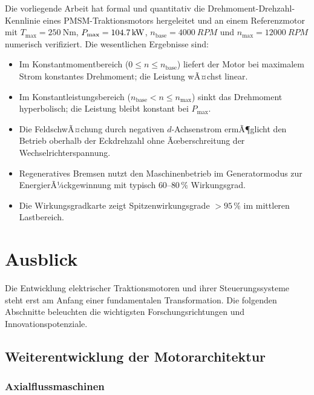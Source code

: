 ﻿\documentclass[a4paper,12pt]{article}
\theoremstyle{definition}
\begin{document}
Die vorliegende Arbeit hat formal und quantitativ die Drehmoment-Drehzahl-Kennlinie
eines PMSM-Traktionsmotors hergeleitet und an einem Referenzmotor mit
$T_{\max} = \SI{250}{\newton\metre}$, $P_{\max} = \SI{104{,}7}{\kilo\watt}$,
$n_{\mathrm{base}} = \SI{4000}{RPM}$ und $n_{\max} = \SI{12000}{RPM}$ numerisch
verifiziert. Die wesentlichen Ergebnisse sind:

\begin{itemize}
    \item Im Konstantmomentbereich ($0 \leq n \leq n_{\mathrm{base}}$) liefert der
          Motor bei maximalem Strom konstantes Drehmoment; die Leistung wÃ¤chst linear.
    \item Im Konstantleistungsbereich ($n_{\mathrm{base}} < n \leq n_{\max}$) sinkt
          das Drehmoment hyperbolisch; die Leistung bleibt konstant bei $P_{\max}$.
    \item Die FeldschwÃ¤chung durch negativen $d$-Achsenstrom ermÃ¶glicht den Betrieb
          oberhalb der Eckdrehzahl ohne Ãœberschreitung der Wechselrichterspannung.
    \item Regeneratives Bremsen nutzt den Maschinenbetrieb im Generatormodus zur
          EnergierÃ¼ckgewinnung mit typisch $60$--$80\,\%$ Wirkungsgrad.
    \item Die Wirkungsgradkarte zeigt Spitzenwirkungsgrade $> 95\,\%$ im mittleren
          Lastbereich.
\end{itemize}

\section{Ausblick}
\label{sec:ausblick}

Die Entwicklung elektrischer Traktionsmotoren und ihrer Steuerungssysteme steht
erst am Anfang einer fundamentalen Transformation. Die folgenden Abschnitte
beleuchten die wichtigsten Forschungsrichtungen und Innovationspotenziale.

\subsection{Weiterentwicklung der Motorarchitektur}

\subsubsection{Axialflussmaschinen}
\end{document}
